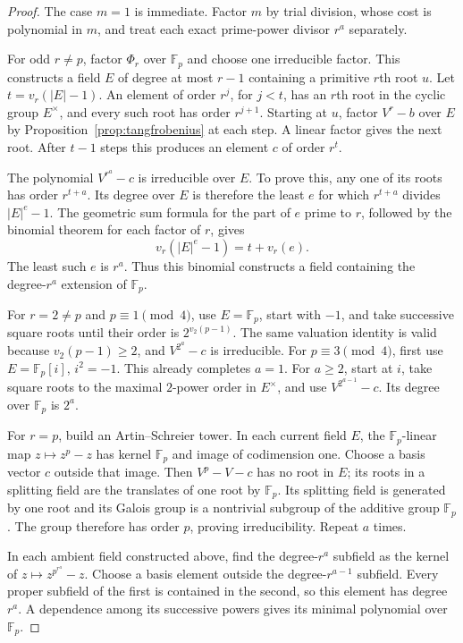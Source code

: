 \documentclass[11pt]{article}
\theoremstyle{definition}
\theoremstyle{remark}
\begin{document}
\begin{proof}
The case $m=1$ is immediate. Factor $m$ by trial division, whose
cost is polynomial in $m$, and treat each exact prime-power divisor
$r^a$ separately.

For odd $r\ne p$, factor $\Phi_r$ over $\mathbb F_p$ and choose
one irreducible factor. This constructs a field $E$ of degree at
most $r-1$ containing a primitive $r$th root $u$. Let
$t=v_r(|E|-1)$. An element of order $r^j$, for $j<t$, has an
$r$th root in the cyclic group $E^\times$, and every such root
has order $r^{j+1}$. Starting at $u$, factor $V^r-b$ over $E$
by Proposition~\ref{prop:tangfrobenius} at each step. A linear
factor gives the next root. After $t-1$ steps this produces an
element $c$ of order $r^t$.

The polynomial $V^{r^a}-c$ is irreducible over $E$. To prove this,
any one of its roots has order $r^{t+a}$. Its degree over $E$ is
therefore the least $e$ for which $r^{t+a}$ divides $|E|^e-1$.
The geometric sum formula for the part of $e$ prime to $r$,
followed by the binomial theorem for each factor of $r$, gives
\[
 v_r(|E|^e-1)=t+v_r(e).
\]
The least such $e$ is $r^a$. Thus this binomial constructs a
field containing the degree-$r^a$ extension of $\mathbb F_p$.

For $r=2\ne p$ and $p\equiv1\pmod4$, use $E=\mathbb F_p$,
start with $-1$, and take successive square roots until their
order is $2^{v_2(p-1)}$. The same valuation identity is valid
because $v_2(p-1)\geq2$, and $V^{2^a}-c$ is irreducible.
For $p\equiv3\pmod4$, first use
$E=\mathbb F_p[i]$, $i^2=-1$. This already completes $a=1$.
For $a\geq2$, start at $i$, take square roots to the maximal
$2$-power order in $E^\times$, and use $V^{2^{a-1}}-c$.
Its degree over $\mathbb F_p$ is $2^a$.

For $r=p$, build an Artin--Schreier tower. In each current field
$E$, the $\mathbb F_p$-linear map $z\mapsto z^p-z$ has kernel
$\mathbb F_p$ and image of codimension one. Choose a basis vector
$c$ outside that image. Then $V^p-V-c$ has no root in $E$;
its roots in a splitting field are the translates of one root by
$\mathbb F_p$. Its splitting field is generated by one root and
its Galois group is a nontrivial subgroup of the additive group
$\mathbb F_p$. The group therefore has order $p$, proving
irreducibility. Repeat $a$ times.

In each ambient field constructed above, find the degree-$r^a$
subfield as the kernel of $z\mapsto z^{p^{r^a}}-z$. Choose a basis
element outside the degree-$r^{a-1}$ subfield. Every proper subfield
of the first is contained in the second, so this element has degree
$r^a$. A dependence among its successive powers gives its minimal
polynomial over $\mathbb F_p$.


\end{proof}
\end{document}
